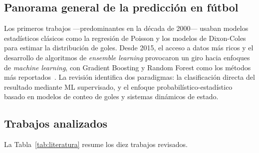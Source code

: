 \documentclass{ieeeaccess}
\begin{document}
\subsection{Panorama general de la predicción en fútbol}
Los primeros trabajos ---predominantes en la década de 2000--- usaban modelos estadísticos clásicos como la regresión de Poisson y los modelos de Dixon-Coles para estimar la distribución de goles. Desde 2015, el acceso a datos más ricos y el desarrollo de algoritmos de \textit{ensemble learning} provocaron un giro hacia enfoques de \textit{machine learning}, con Gradient Boosting y Random Forest como los métodos más reportados~\cite{ricogonzalez2023ml}. La revisión identifica dos paradigmas: la clasificación directa del resultado mediante ML supervisado, y el enfoque probabilístico-estadístico basado en modelos de conteo de goles y sistemas dinámicos de estado.

\subsection{Trabajos analizados}
La Tabla~\ref{tab:literatura} resume los diez trabajos revisados.
\end{document}

